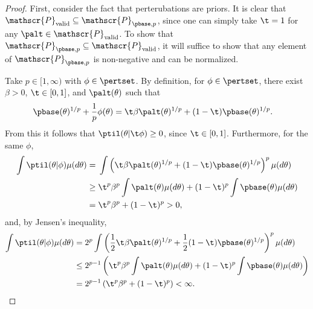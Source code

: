 
\begin{proof}
%
First, consider the fact that perterubations are priors. It is clear that
$\mathscr{P}_{\mathrm{valid}} \subseteq \mathscr{P}_{\pbase,p}$, since one can
simply take $\t = 1$ for any $\palt \in \mathscr{P}_{\mathrm{valid}}$.  To show
that $\mathscr{P}_{\pbase,p} \subseteq \mathscr{P}_{\mathrm{valid}}$, it will
suffice to show that any element of $\mathscr{P}_{\pbase,p}$ is non-negative and
can be normalized.

Take $p \in [1, \infty)$ with $\phi \in \pertset$.  By definition, for $\phi \in
\pertset$, there exist $\beta > 0$, $\t \in [0,1]$, and $\palt(\theta)$ such
that
%
\begin{align*}
%
\pbase(\theta)^{1/p} + \frac{1}{p} \phi(\theta) ={}&
    \t \beta \palt(\theta)^{1/p} + (1- \t) \pbase(\theta)^{1/p}.
%
\end{align*}
%
From this it follows that $\ptil(\theta \vert \t \phi) \ge 0$, since $\t \in
[0,1]$.  Furthermore, for the same $\phi$,
%
\begin{align*}
%
\int \ptil(\theta \vert \phi) \mu(d\theta) ={}&
\int \left(\t \beta \palt(\theta)^{1/p} +
           (1- \t) \pbase(\theta)^{1/p} \right)^{p} \mu(d\theta)
\\\ge{}&
\t^p \beta^p \int \palt(\theta) \mu(d\theta) +
    (1- \t)^p \int \pbase(\theta) \mu(d\theta)
\\={}& \t^p \beta^p + (1- \t)^p > 0,
%
\end{align*}
%
and, by Jensen's inequality,
%
\begin{align*}
%
\int \ptil(\theta \vert \phi) \mu(d\theta) ={}&
2^p \int \left(\frac{1}{2} \t \beta \palt(\theta)^{1/p} +
           \frac{1}{2} (1- \t) \pbase(\theta)^{1/p} \right)^{p} \mu(d\theta)
\\\le{}&
%
2^{p-1} \left(
    \t^p \beta^p \int \palt(\theta) \mu(d\theta) +
    (1- \t)^p \int  \pbase(\theta)\mu(d\theta)
\right)
\\={}& 2^{p-1} \left( \t^p \beta^p + (1- \t)^p\right) < \infty.
%
\end{align*}


\end{proof}
